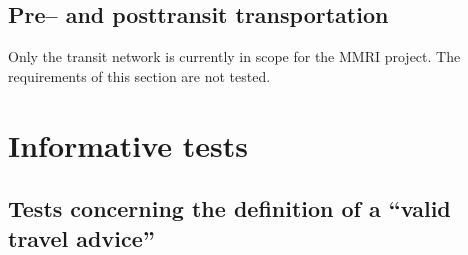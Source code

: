 \documentclass[a4paper,11pt]{article}
\begin{document}
\subsection{Pre-- and posttransit transportation} 

Only the transit network is currently in scope for the MMRI project. The requirements of this section are not tested.

\newpage
\section{Informative tests}
\label{sec:nonunit}


\subsection{Tests concerning the definition of a ``valid travel advice''}
\end{document}
